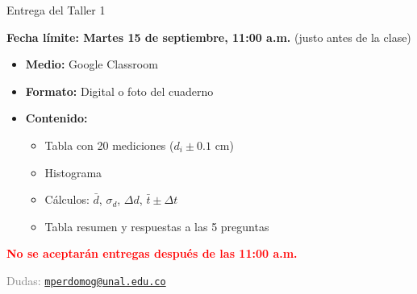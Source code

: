 \documentclass[aspectratio=169,xcolor=dvipsnames]{beamer}
\begin{document}
\begin{frame}{Entrega del Taller 1}
	\begin{block}{}
		\centering
		\large \textbf{Fecha límite: Martes 15 de septiembre, 11:00 a.m.}
		\normalsize \quad (justo antes de la clase)
	\end{block}
	
	\vspace{0.15cm}
	\begin{itemize}
		\setlength{\itemsep}{3pt}
		\item \textbf{Medio:} Google Classroom
		\item \textbf{Formato:} Digital o foto del cuaderno
		\item \textbf{Contenido:}
		\begin{itemize}
			\setlength{\itemsep}{1pt}
			\item Tabla con 20 mediciones ($d_i \pm 0.1$ cm)
			\item Histograma
			\item Cálculos: $\bar{d}$, $\sigma_d$, $\Delta d$, $\bar{t} \pm \Delta t$
			\item Tabla resumen y respuestas a las 5 preguntas
		\end{itemize}
	\end{itemize}
	
	\vspace{0.15cm}
	\begin{center}
		\textcolor{red}{\textbf{No se aceptarán entregas después de las 11:00 a.m.}}
	\end{center}
	
	\vspace{0.1cm}
	\begin{center}
		\tiny \textcolor{gray}{Dudas: \href{mailto:mperdomog@unal.edu.co}{\texttt{mperdomog@unal.edu.co}}}
	\end{center}
\end{frame}
\end{document}
